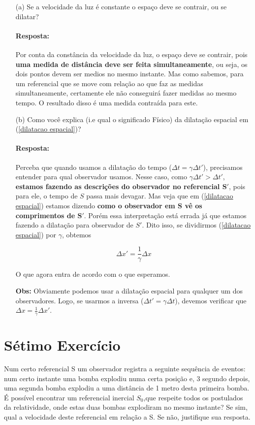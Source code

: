 \documentclass[10pt,a4paper]{article}
\begin{document}
	\begin{itemize}
		\item[(a)] Se a velocidade da luz é constante o espaço deve se contrair, ou se dilatar?
		
		\paragraph{Resposta:} Por conta da constância da velocidade da luz, o espaço deve se contrair, pois \textbf{uma medida de distância deve ser feita simultaneamente}, ou seja, os dois pontos devem ser medios no mesmo instante. Mas como sabemos, para um referencial que se move com relação ao que faz as medidas simultaneamente, certamente ele não conseguirá fazer medidas ao mesmo tempo. O resultado disso é uma medida contraída para este.
		
		
		\item[(b)] Como você explica (i.e qual o significado Físico) da dilatação espacial em (\ref{dilatacao espacial})?
		
		\paragraph{Resposta:}  Perceba que quando usamos a dilatação do tempo ($\Delta t = \gamma \Delta t'$), precisamos entender para qual observador usamos. Nesse caso, como $\gamma \Delta t' > \Delta t'$, \textbf{estamos fazendo as descrições do observador no referencial $\mathbf{S'}$}, pois para ele, o tempo de $S$ passa mais devagar. Mas veja que em (\ref{dilatacao espacial}) estamos dizendo \textbf{como o observador em $\mathbf{S}$ vê os comprimentos de $\mathbf{S'}$}. Porém essa interpretação está errada já que estamos fazendo a dilatação para observador de $S'$. Dito isso, se dividirmos (\ref{dilatacao espacial}) por $\gamma$, obtemos 
		
		\begin{equation}
			\Delta x' = \frac{1}{\gamma}\Delta x
		\end{equation}
		
		O que agora entra de acordo com o que esperamos.
		
		\textbf{Obs:} Obviamente podemos usar a dilatação espacial para qualquer um dos observadores. Logo, se usarmos a inversa ($\Delta t' = \gamma \Delta t$), devemos verificar que $\Delta x = \frac{1}{\gamma}\Delta x'$.
	\end{itemize}
	
	
	\section{Sétimo Exercício}
	Num certo referencial S um observador registra a seguinte sequência de eventos: num certo instante uma bomba explodiu numa certa posição e, 3 segundo depois, uma segunda bomba explodiu a uma distância de 1 metro
	desta primeira bomba. É possível encontrar um referencial inercial $ S_0 $,que respeite todos os postulados da relatividade, onde estas duas bombas explodiram no mesmo instante? Se sim, qual a velocidade deste referencial
	em relação a S. Se não, justifique sua resposta.
	
\end{document}
